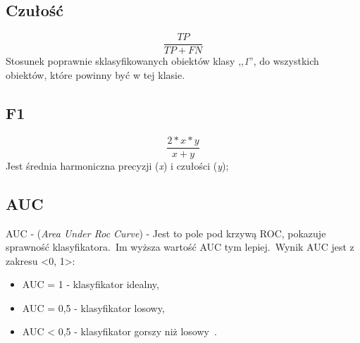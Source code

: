 \subsection{Czułość}
\begin{equation}\label{math:rec}
    \frac{TP}{TP + FN}
\end{equation}
Stosunek poprawnie sklasyfikowanych obiektów klasy ,,\textit{1}'', do wszystkich obiektów, które powinny być w tej klasie.

\vfill
\pagebreak

\subsection{F1}
\begin{equation}\label{math:f1}
   \frac{2*x*y}{x + y}
\end{equation}
Jest średnia harmoniczna precyzji (\textit{x}) i czułości (\textit{y});


\subsection{AUC}
AUC - (\textit{Area Under Roc Curve}) - Jest to pole pod krzywą ROC, pokazuje sprawność klasyfikatora.\ Im wyższa wartość AUC tym lepiej.\ Wynik AUC jest z zakresu <0, 1>:
\begin{itemize}
    \item AUC = 1 - klasyfikator idealny,
    \item AUC = 0,5 - klasyfikator losowy,
    \item AUC < 0,5 - klasyfikator gorszy niż losowy~\cite{Algolytics}.
\end{itemize}